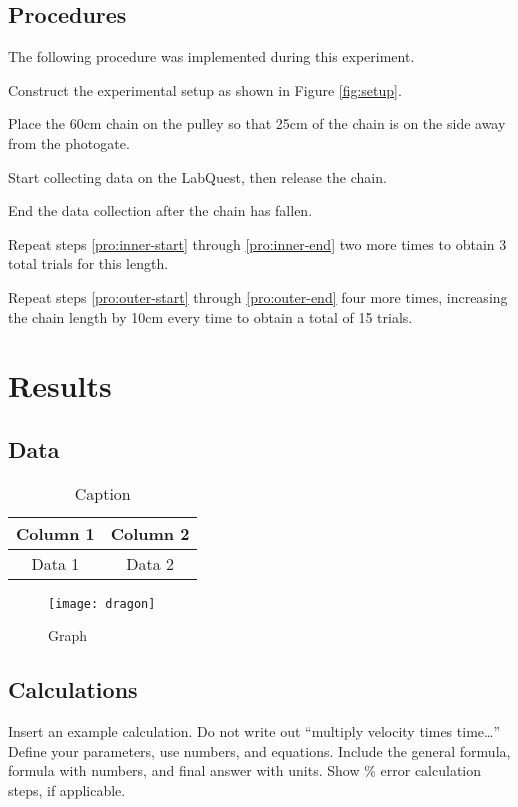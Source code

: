 \documentclass[stu,biblatex,floatsintext,draftall]{apa7}
\begin{document}
\subsection{Procedures}
The following procedure was implemented during this experiment.
\begin{APAenumerate}
	\item Construct the experimental setup as shown in Figure \ref{fig:setup}.
	\item\label{pro:outer-start} Place the 60\unit{\centi\meter} chain on the pulley so that 25\unit{\centi\meter} of the chain is on the side away from the photogate.
	\item\label{pro:inner-start} Start collecting data on the LabQuest, then release the chain.
	\item\label{pro:inner-end} End the data collection after the chain has fallen.
	\item\label{pro:outer-end} Repeat steps \ref{pro:inner-start} through \ref{pro:inner-end} two more times to obtain 3 total trials for this length.
	\item Repeat steps \ref{pro:outer-start} through \ref{pro:outer-end} four more times, increasing the chain length by 10\unit{\centi\meter} every time to obtain a total of 15 trials.
\end{APAenumerate}

\section{Results}
\subsection{Data}
\begin{table}
	\centering
	\caption{Caption}
	\label{tab:data}
	\begin{tabular}{cc}
		Column 1 & Column 2 \\
		\hline
		Data 1 & Data 2
	\end{tabular}
\end{table}
\begin{figure}
	\caption{Graph}
	\label{fig:data-graph}
	\texttt{[image: dragon]}
\end{figure}

\subsection{Calculations}
Insert an example calculation.  Do not write out “multiply velocity times time…”  Define your parameters, use numbers, and equations. Include the general formula, formula with numbers, and final answer with units. Show \% error calculation steps, if applicable.
\end{document}
